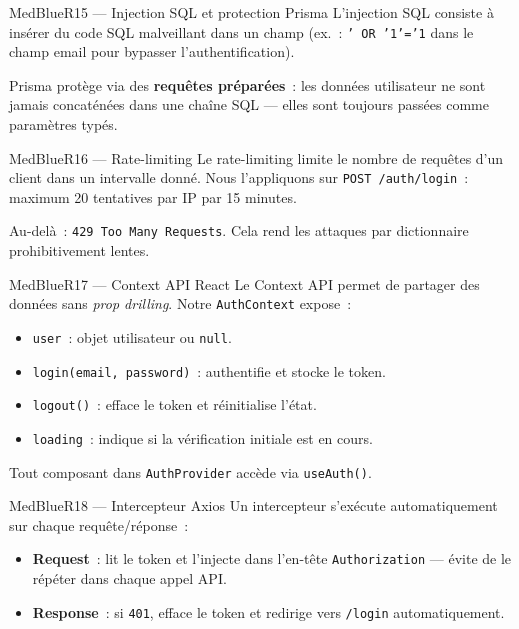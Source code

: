 \documentclass[12pt,a4paper,oneside]{report}
\begin{document}
\begin{qbox}{MedBlue}{R15 --- Injection SQL et protection Prisma}
L'injection SQL consiste à insérer du code SQL malveillant dans un champ
(ex.~: \texttt{' OR '1'='1} dans le champ email pour bypasser
l'authentification).

Prisma protège via des \textbf{requêtes préparées}~: les données
utilisateur ne sont jamais concaténées dans une chaîne SQL --- elles
sont toujours passées comme paramètres typés.
\end{qbox}

\begin{qbox}{MedBlue}{R16 --- Rate-limiting}
Le rate-limiting limite le nombre de requêtes d'un client dans un
intervalle donné. Nous l'appliquons sur \texttt{POST /auth/login}~:
maximum 20 tentatives par IP par 15 minutes.

Au-delà~: \texttt{429 Too Many Requests}. Cela rend les attaques par
dictionnaire prohibitivement lentes.
\end{qbox}

\begin{qbox}{MedBlue}{R17 --- Context API React}
Le Context API permet de partager des données sans \textit{prop
drilling}. Notre \texttt{AuthContext} expose~:
\begin{itemize}
  \item \texttt{user}~: objet utilisateur ou \texttt{null}.
  \item \texttt{login(email, password)}~: authentifie et stocke le token.
  \item \texttt{logout()}~: efface le token et réinitialise l'état.
  \item \texttt{loading}~: indique si la vérification initiale est en
        cours.
\end{itemize}
Tout composant dans \texttt{AuthProvider} accède via \texttt{useAuth()}.
\end{qbox}

\begin{qbox}{MedBlue}{R18 --- Intercepteur Axios}
Un intercepteur s'exécute automatiquement sur chaque requête/réponse~:
\begin{itemize}
  \item \textbf{Request}~: lit le token et l'injecte dans l'en-tête
        \texttt{Authorization} --- évite de le répéter dans chaque
        appel API.
  \item \textbf{Response}~: si \texttt{401}, efface le token et
        redirige vers \texttt{/login} automatiquement.
\end{itemize}
\end{qbox}
\end{document}
